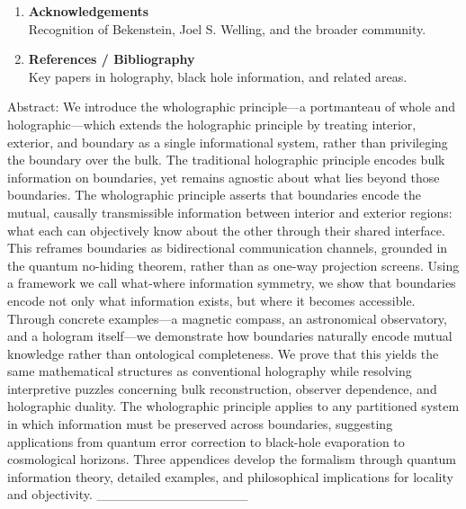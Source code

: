 ﻿\documentclass[12pt]{article}
\begin{document}
\begin{enumerate}
    \begin{itemize}
        \item \emph{Appendix A: Category-Theoretic Formulation} -- rigorous formalism using objects, morphisms, and commutative diagrams.
        \item \emph{Appendix B: Information Capacity, Boundary Area, and Coarse-Graining} -- calculations, hierarchy of information bounds, and physical interpretation.
    \end{itemize}
    \item \textbf{Acknowledgements} \\
    Recognition of Bekenstein, Joel S. Welling, and the broader community.
    \item \textbf{References / Bibliography} \\
    Key papers in holography, black hole information, and related areas.
\end{enumerate}
Abstract: 
We introduce the wholographic principle—a portmanteau of whole and holographic—which extends the holographic principle by treating interior, exterior, and boundary as a single informational system, rather than privileging the boundary over the bulk. The traditional holographic principle encodes bulk information on boundaries, yet remains agnostic about what lies beyond those boundaries.
The wholographic principle asserts that boundaries encode the mutual, causally transmissible information between interior and exterior regions: what each can objectively know about the other through their shared interface. This reframes boundaries as bidirectional communication channels, grounded in the quantum no-hiding theorem, rather than as one-way projection screens.
Using a framework we call what-where information symmetry, we show that boundaries encode not only what information exists, but where it becomes accessible. Through concrete examples—a magnetic compass, an astronomical observatory, and a hologram itself—we demonstrate how boundaries naturally encode mutual knowledge rather than ontological completeness. We prove that this yields the same mathematical structures as conventional holography while resolving interpretive puzzles concerning bulk reconstruction, observer dependence, and holographic duality.
The wholographic principle applies to any partitioned system in which information must be preserved across boundaries, suggesting applications from quantum error correction to black-hole evaporation to cosmological horizons. Three appendices develop the formalism through quantum information theory, detailed examples, and philosophical implications for locality and objectivity.
________________
\end{document}
